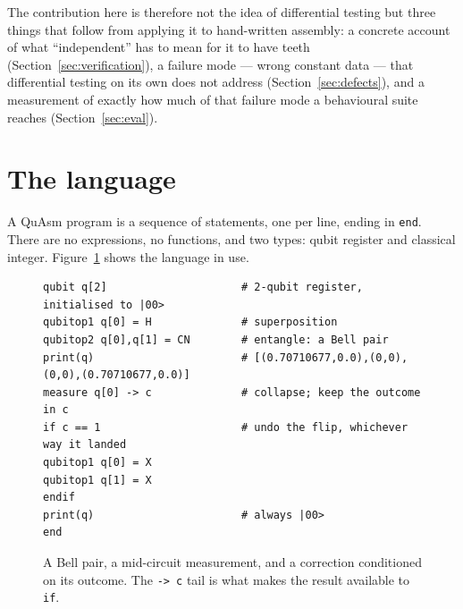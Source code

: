 \documentclass[11pt]{article}
\newcommand{\quasm}{QuAsm}
\begin{document}
The contribution here is therefore not the idea of differential testing but three things
that follow from applying it to hand-written assembly: a concrete account of what
``independent'' has to mean for it to have teeth (Section~\ref{sec:verification}), a
failure mode --- wrong constant data --- that differential testing on its own does not
address (Section~\ref{sec:defects}), and a measurement of exactly how much of that failure
mode a behavioural suite reaches (Section~\ref{sec:eval}).

\section{The language}
\label{sec:language}

A \quasm{} program is a sequence of statements, one per line, ending in \texttt{end}.
There are no expressions, no functions, and two types: qubit register and classical
integer. Figure~\ref{fig:bell} shows the language in use.

\begin{figure}[t]
\begin{lstlisting}
qubit q[2]                     # 2-qubit register, initialised to |00>
qubitop1 q[0] = H              # superposition
qubitop2 q[0],q[1] = CN        # entangle: a Bell pair
print(q)                       # [(0.70710677,0.0),(0,0),(0,0),(0.70710677,0.0)]
measure q[0] -> c              # collapse; keep the outcome in c
if c == 1                      # undo the flip, whichever way it landed
qubitop1 q[0] = X
qubitop1 q[1] = X
endif
print(q)                       # always |00>
end
\end{lstlisting}
\caption{A Bell pair, a mid-circuit measurement, and a correction conditioned on its
outcome. The \texttt{-> c} tail is what makes the result available to \texttt{if}.}
\label{fig:bell}
\end{figure}
\end{document}
